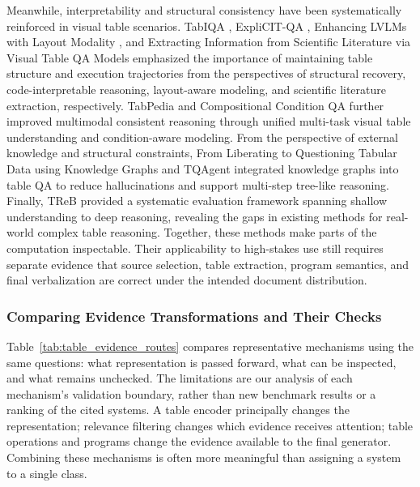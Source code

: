 Meanwhile, interpretability and structural consistency have been systematically reinforced in visual table scenarios. TabIQA \cite{nguyen2023tabiqa}, ExpliCIT-QA \cite{hormazabal2025explicit}, Enhancing LVLMs with Layout Modality \cite{aida2025enhancing}, and Extracting Information from Scientific Literature via Visual Table QA Models \cite{kim2024extracting} emphasized the importance of maintaining table structure and execution trajectories from the perspectives of structural recovery, code-interpretable reasoning, layout-aware modeling, and scientific literature extraction, respectively. TabPedia \cite{zhao2024tabpedia} and Compositional Condition QA \cite{jiangcompositional} further improved multimodal consistent reasoning through unified multi-task visual table understanding and condition-aware modeling. From the perspective of external knowledge and structural constraints, From Liberating to Questioning Tabular Data using Knowledge Graphs \cite{raj2024liberating} and TQAgent \cite{zhao2025tqagent} integrated knowledge graphs into table QA to reduce hallucinations and support multi-step tree-like reasoning. Finally, TReB \cite{li2025treb} provided a systematic evaluation framework spanning shallow understanding to deep reasoning, revealing the gaps in existing methods for real-world complex table reasoning. Together, these methods make parts of the computation inspectable. Their applicability to high-stakes use still requires separate evidence that source selection, table extraction, program semantics, and final verbalization are correct under the intended document distribution.

\subsubsection{Comparing Evidence Transformations and Their Checks}

Table~\ref{tab:table_evidence_routes} compares representative mechanisms using the same questions: what representation is passed forward, what can be inspected, and what remains unchecked. The limitations are our analysis of each mechanism's validation boundary, rather than new benchmark results or a ranking of the cited systems. A table encoder principally changes the representation; relevance filtering changes which evidence receives attention; table operations and programs change the evidence available to the final generator. Combining these mechanisms is often more meaningful than assigning a system to a single class.

